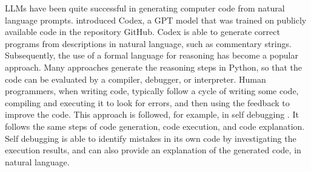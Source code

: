 LLMs have been quite successful in generating computer code from natural language prompts.
\citet{chen2021evaluating} introduced Codex, a GPT model that
was trained on publicly available  code in the repository
GitHub.  Codex is able to generate correct programs from
descriptions in natural language, such as commentary strings.
%
Subsequently, the use of a formal language for reasoning has become a popular approach. %
Many approaches  generate the reasoning steps in Python, so that  the code can  be evaluated by a compiler, debugger, or interpreter.
Human programmers, when writing code, typically
follow a cycle of writing some code, compiling and executing it to look for errors,
and then using the feedback to improve the code. This approach
is followed, for example, in self debugging 
\citep{chen2023teaching}. %
It follows the same steps of  code generation, 
code execution, and  code explanation.
%
Self debugging is able %
to identify mistakes in its own
code %
by investigating the execution
results, and can also provide an explanation of the generated code, in
natural language. %


